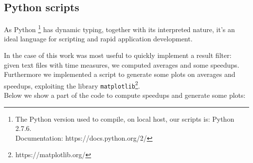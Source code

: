 	
	\subsection{Python scripts}
	As Python \footnote{The Python version used to compile, on local host, our scripts is: Python 2.7.6.\\ Documentation: https://docs.python.org/2/} has dynamic typing, together with its interpreted nature, it's an ideal language for scripting and rapid application development.
	
	In the case of this work was most useful to quickly implement a result filter: given text files with time measures, we computed averages and some speedups. \\
	Furthermore we implemented a script to generate some plots on averages and speedups, exploiting the library \texttt{matplotlib}\footnote{https://matplotlib.org/}.\\
	Below we show a part of the code to compute speedups and generate some plots:\\
